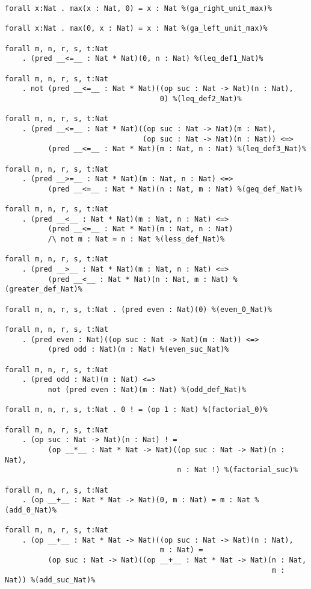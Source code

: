 \documentclass[11pt,a4paper]{article}
\begin{document}
\begin{verbatim}
forall x:Nat . max(x : Nat, 0) = x : Nat %(ga_right_unit_max)%

forall x:Nat . max(0, x : Nat) = x : Nat %(ga_left_unit_max)%

forall m, n, r, s, t:Nat
    . (pred __<=__ : Nat * Nat)(0, n : Nat) %(leq_def1_Nat)%

forall m, n, r, s, t:Nat
    . not (pred __<=__ : Nat * Nat)((op suc : Nat -> Nat)(n : Nat),
                                    0) %(leq_def2_Nat)%

forall m, n, r, s, t:Nat
    . (pred __<=__ : Nat * Nat)((op suc : Nat -> Nat)(m : Nat),
                                (op suc : Nat -> Nat)(n : Nat)) <=>
          (pred __<=__ : Nat * Nat)(m : Nat, n : Nat) %(leq_def3_Nat)%

forall m, n, r, s, t:Nat
    . (pred __>=__ : Nat * Nat)(m : Nat, n : Nat) <=>
          (pred __<=__ : Nat * Nat)(n : Nat, m : Nat) %(geq_def_Nat)%

forall m, n, r, s, t:Nat
    . (pred __<__ : Nat * Nat)(m : Nat, n : Nat) <=>
          (pred __<=__ : Nat * Nat)(m : Nat, n : Nat)
          /\ not m : Nat = n : Nat %(less_def_Nat)%

forall m, n, r, s, t:Nat
    . (pred __>__ : Nat * Nat)(m : Nat, n : Nat) <=>
          (pred __<__ : Nat * Nat)(n : Nat, m : Nat) %(greater_def_Nat)%

forall m, n, r, s, t:Nat . (pred even : Nat)(0) %(even_0_Nat)%

forall m, n, r, s, t:Nat
    . (pred even : Nat)((op suc : Nat -> Nat)(m : Nat)) <=>
          (pred odd : Nat)(m : Nat) %(even_suc_Nat)%

forall m, n, r, s, t:Nat
    . (pred odd : Nat)(m : Nat) <=>
          not (pred even : Nat)(m : Nat) %(odd_def_Nat)%

forall m, n, r, s, t:Nat . 0 ! = (op 1 : Nat) %(factorial_0)%

forall m, n, r, s, t:Nat
    . (op suc : Nat -> Nat)(n : Nat) ! =
          (op __*__ : Nat * Nat -> Nat)((op suc : Nat -> Nat)(n : Nat),
                                        n : Nat !) %(factorial_suc)%

forall m, n, r, s, t:Nat
    . (op __+__ : Nat * Nat -> Nat)(0, m : Nat) = m : Nat %(add_0_Nat)%

forall m, n, r, s, t:Nat
    . (op __+__ : Nat * Nat -> Nat)((op suc : Nat -> Nat)(n : Nat),
                                    m : Nat) =
          (op suc : Nat -> Nat)((op __+__ : Nat * Nat -> Nat)(n : Nat,
                                                              m : Nat)) %(add_suc_Nat)%


\end{verbatim}
\end{document}
